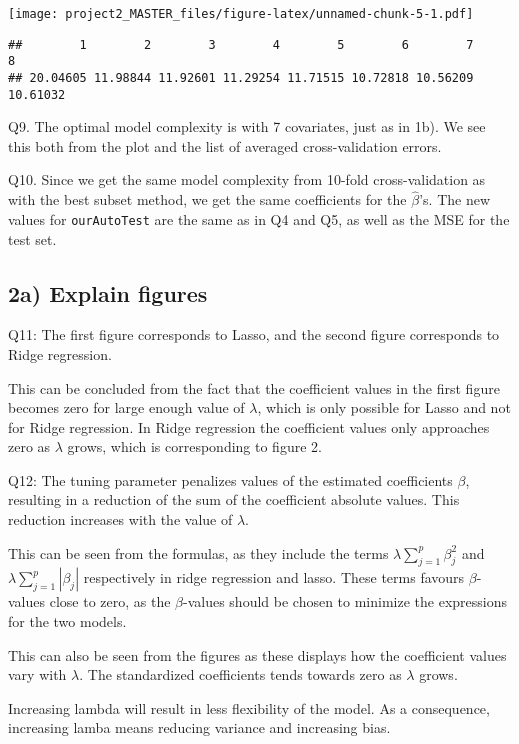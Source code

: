 \documentclass[]{article}
\begin{document}
\texttt{[image: project2\_MASTER\_files/figure-latex/unnamed-chunk-5-1.pdf]}

\begin{verbatim}
##        1        2        3        4        5        6        7        8 
## 20.04605 11.98844 11.92601 11.29254 11.71515 10.72818 10.56209 10.61032
\end{verbatim}

Q9. The optimal model complexity is with 7 covariates, just as in 1b).
We see this both from the plot and the list of averaged cross-validation
errors.

Q10. Since we get the same model complexity from 10-fold
cross-validation as with the best subset method, we get the same
coefficients for the \(\hat\beta\)'s. The new values for
\texttt{ourAutoTest} are the same as in Q4 and Q5, as well as the MSE
for the test set.

\subsection{2a) Explain figures}\label{a-explain-figures}

Q11: The first figure corresponds to Lasso, and the second figure
corresponds to Ridge regression.

This can be concluded from the fact that the coefficient values in the
first figure becomes zero for large enough value of \(\lambda\), which
is only possible for Lasso and not for Ridge regression. In Ridge
regression the coefficient values only approaches zero as \(\lambda\)
grows, which is corresponding to figure 2.

Q12: The tuning parameter penalizes values of the estimated coefficients
\(\beta\), resulting in a reduction of the sum of the coefficient
absolute values. This reduction increases with the value of \(\lambda\).

This can be seen from the formulas, as they include the terms
\(\lambda \sum_{j=1}^p \beta_j^2\) and
\(\lambda \sum_{j=1}^p |\beta_j|\) respectively in ridge regression and
lasso. These terms favours \(\beta\)-values close to zero, as the
\(\beta\)-values should be chosen to minimize the expressions for the
two models.

This can also be seen from the figures as these displays how the
coefficient values vary with \(\lambda\). The standardized coefficients
tends towards zero as \(\lambda\) grows.

Increasing lambda will result in less flexibility of the model. As a
consequence, increasing lamba means reducing variance and increasing
bias.
\end{document}
